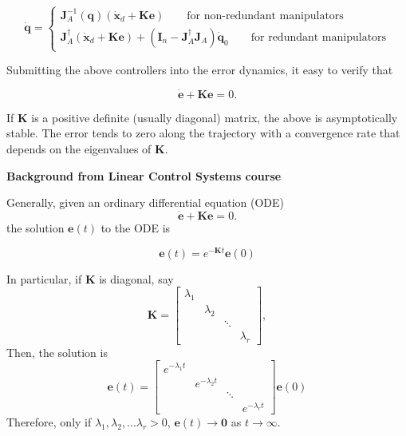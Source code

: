 \documentclass[10pt]{article}
\begin{document}
$$
\dot{\boldsymbol{q}}=
\begin{cases}
\boldsymbol{J}_{A}^{-1}(\boldsymbol{q})\left(\dot{\boldsymbol{x}}_{d}+\boldsymbol{K} \boldsymbol{e}\right)  \quad\quad\text{for non-redundant manipulators} \\
\boldsymbol{J}_{A}^{\dagger}\left(\dot{\boldsymbol{x}}_{d}+\boldsymbol{K e}\right)+\left(\boldsymbol{I}_{n}-\boldsymbol{J}_{A}^{\dagger} \boldsymbol{J}_{A}\right) \dot{\boldsymbol{q}}_{0} \quad\quad\text{for redundant manipulators}
\end{cases}
$$



Submitting the above controllers into the error dynamics, it easy to verify that


$$
\dot{\boldsymbol{e}}+\boldsymbol{K} \boldsymbol{e}=0 .
$$

If $\boldsymbol{K}$ is a positive definite (usually diagonal) matrix, the above is asymptotically stable. The error tends to zero along the trajectory with a convergence rate that depends on the eigenvalues of  $\boldsymbol{K}$.


\begin{shaded}

\textbf{Background from Linear Control Systems course}


Generally, given an ordinary differential equation (ODE)  $$
\dot{\boldsymbol{e}}+\boldsymbol{K} \boldsymbol{e}=0 .
$$ the solution $\boldsymbol{e}(t)$ to the ODE is 

$$
\boldsymbol{e}(t)=e^{\boldsymbol{-K}t}\boldsymbol{e}(0)
$$

In particular, if $\boldsymbol{K}$ is diagonal, say $$
\boldsymbol{K}=\begin{bmatrix}
\lambda_1& & &\\
&\lambda_2 & & \\
& & \ddots &\\
& & & \lambda_r
\end{bmatrix},
$$
Then, the solution is 
\begin{equation}
    \boldsymbol{e}(t)=\begin{bmatrix}
e^{-\lambda_1t}& & &\\
&e^{-\lambda_2t} & & \\
& & \ddots &\\
& & & e^{-\lambda_rt}
\end{bmatrix}\boldsymbol{e}(0)
\end{equation}
Therefore, only if $\lambda_1, \lambda_2, ...\lambda_r>0$, $\boldsymbol{e}(t)\rightarrow \boldsymbol{0}$ as $t\rightarrow \infty$. 

\end{shaded}
\end{document}

